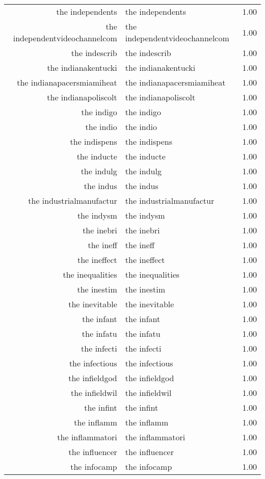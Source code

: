 \begin{table}[ht]
\begin{tabular}{rlr}
  the independents & the independents & 1.00 \\ 
  the independentvideochannelcom & the independentvideochannelcom & 1.00 \\ 
  the indescrib & the indescrib & 1.00 \\ 
  the indianakentucki & the indianakentucki & 1.00 \\ 
  the indianapacersmiamiheat & the indianapacersmiamiheat & 1.00 \\ 
  the indianapoliscolt & the indianapoliscolt & 1.00 \\ 
  the indigo & the indigo & 1.00 \\ 
  the indio & the indio & 1.00 \\ 
  the indispens & the indispens & 1.00 \\ 
  the inducte & the inducte & 1.00 \\ 
  the indulg & the indulg & 1.00 \\ 
  the indus & the indus & 1.00 \\ 
  the industrialmanufactur & the industrialmanufactur & 1.00 \\ 
  the indysm & the indysm & 1.00 \\ 
  the inebri & the inebri & 1.00 \\ 
  the ineff & the ineff & 1.00 \\ 
  the ineffect & the ineffect & 1.00 \\ 
  the inequalities & the inequalities & 1.00 \\ 
  the inestim & the inestim & 1.00 \\ 
  the inevitable & the inevitable & 1.00 \\ 
  the infant & the infant & 1.00 \\ 
  the infatu & the infatu & 1.00 \\ 
  the infecti & the infecti & 1.00 \\ 
  the infectious & the infectious & 1.00 \\ 
  the infieldgod & the infieldgod & 1.00 \\ 
  the infieldwil & the infieldwil & 1.00 \\ 
  the infint & the infint & 1.00 \\ 
  the inflamm & the inflamm & 1.00 \\ 
  the inflammatori & the inflammatori & 1.00 \\ 
  the influencer & the influencer & 1.00 \\ 
  the infocamp & the infocamp & 1.00 \\ 

\end{tabular}
\end{table}
